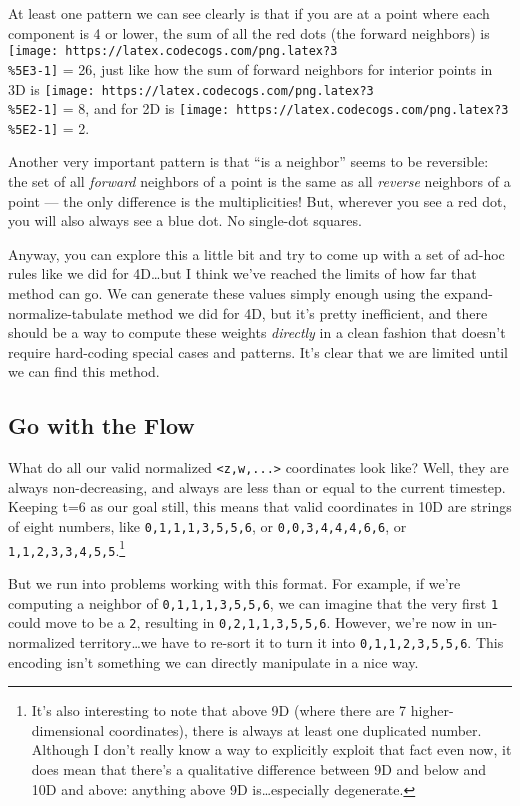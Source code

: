 \documentclass[]{article}
\begin{document}
At least one pattern we can see clearly is that if you are at a point where each
component is 4 or lower, the sum of all the red dots (the forward neighbors) is
\texttt{[image: https://latex.codecogs.com/png.latex?3\\\%5E3-1]} = 26, just like
how the sum of forward neighbors for interior points in 3D is
\texttt{[image: https://latex.codecogs.com/png.latex?3\\\%5E2-1]} = 8, and for 2D
is \texttt{[image: https://latex.codecogs.com/png.latex?3\\\%5E2-1]} = 2.

Another very important pattern is that ``is a neighbor'' seems to be reversible:
the set of all \emph{forward} neighbors of a point is the same as all
\emph{reverse} neighbors of a point --- the only difference is the
multiplicities! But, wherever you see a red dot, you will also always see a blue
dot. No single-dot squares.

Anyway, you can explore this a little bit and try to come up with a set of
ad-hoc rules like we did for 4D\ldots but I think we've reached the limits of
how far that method can go. We can generate these values simply enough using the
expand-normalize-tabulate method we did for 4D, but it's pretty inefficient, and
there should be a way to compute these weights \emph{directly} in a clean
fashion that doesn't require hard-coding special cases and patterns. It's clear
that we are limited until we can find this method.

\hypertarget{go-with-the-flow}{%
\subsection{Go with the Flow}\label{go-with-the-flow}}

What do all our valid normalized \texttt{\textless{}z,w,...\textgreater{}}
coordinates look like? Well, they are always non-decreasing, and always are less
than or equal to the current timestep. Keeping t=6 as our goal still, this means
that valid coordinates in 10D are strings of eight numbers, like
\texttt{0,1,1,1,3,5,5,6}, or \texttt{0,0,3,4,4,4,6,6}, or
\texttt{1,1,2,3,3,4,5,5}.\footnote{It's also interesting to note that above 9D
  (where there are 7 higher-dimensional coordinates), there is always at least
  one duplicated number. Although I don't really know a way to explicitly
  exploit that fact even now, it does mean that there's a qualitative difference
  between 9D and below and 10D and above: anything above 9D is\ldots especially
  degenerate.}

But we run into problems working with this format. For example, if we're
computing a neighbor of \texttt{0,1,1,1,3,5,5,6}, we can imagine that the very
first \texttt{1} could move to be a \texttt{2}, resulting in
\texttt{0,2,1,1,3,5,5,6}. However, we're now in un-normalized territory\ldots we
have to re-sort it to turn it into \texttt{0,1,1,2,3,5,5,6}. This encoding isn't
something we can directly manipulate in a nice way.
\end{document}
